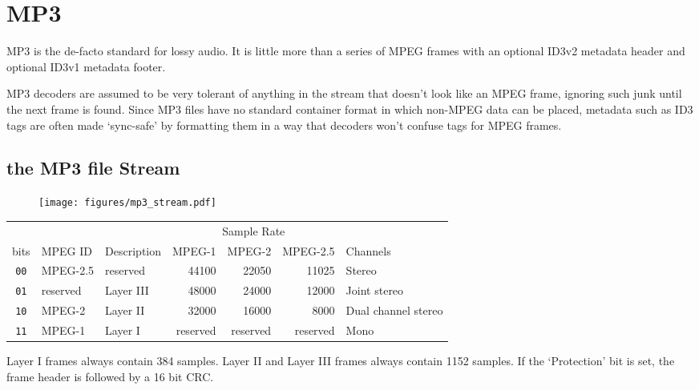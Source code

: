 
\chapter{MP3}
MP3 is the de-facto standard for lossy audio.
It is little more than a series of MPEG frames with an
optional ID3v2 metadata header and optional ID3v1 metadata
footer.

MP3 decoders are assumed to be very tolerant of anything in
the stream that doesn't look like an MPEG frame, ignoring such
junk until the next frame is found.
Since MP3 files have no standard container format in which
non-MPEG data can be placed, metadata such as ID3 tags are often
made `sync-safe' by formatting them in a way that decoders won't
confuse tags for MPEG frames.
\section{the MP3 file Stream}
\begin{figure}[h]
\texttt{[image: figures/mp3\_stream.pdf]}
\end{figure}
\begin{table}[h]
\begin{tabular}{|c||l||l||r|r|r||l|}
\hline
& & & \multicolumn{3}{c||}{Sample Rate} & \\
bits & MPEG ID & Description & MPEG-1 & MPEG-2 & MPEG-2.5 & Channels \\
\hline
\texttt{00} & MPEG-2.5 & reserved & 44100 & 22050 & 11025 & Stereo \\
\texttt{01} & reserved & Layer III & 48000 & 24000 & 12000 & Joint stereo \\
\texttt{10} & MPEG-2 & Layer II & 32000 & 16000 & 8000 & Dual channel stereo\\
\texttt{11} & MPEG-1 & Layer I & reserved & reserved & reserved & Mono \\
\hline
\end{tabular}
\end{table}
\par
\noindent
Layer I frames always contain 384 samples.
Layer II and Layer III frames always contain 1152 samples.
If the `Protection' bit is set, the frame header is followed by a
16 bit CRC.

